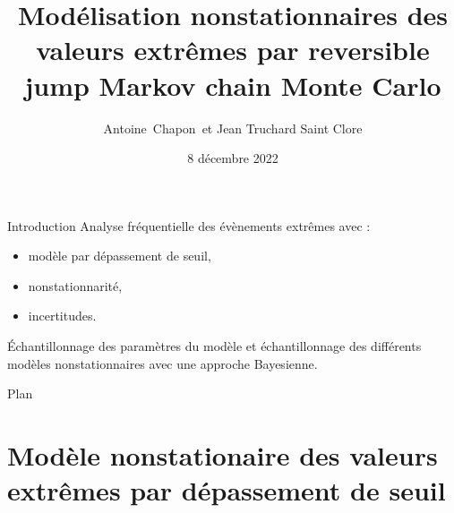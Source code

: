 \documentclass[aspectratio=169]{beamer}
\date{8 décembre 2022}
\title{Modélisation nonstationnaires des valeurs extrêmes par reversible jump Markov chain Monte Carlo}
\author{Antoine~Chapon~et Jean Truchard Saint Clore}
\institute[Universities of Somewhere and Elsewhere] %
{
  cours ETE 405
 }
\begin{document}
\begin{frame}
  \titlepage
\end{frame}



\section*{}

\begin{frame}{Introduction}
Analyse fréquentielle des évènements extrêmes avec :
\vspace{0.5cm}
\begin{itemize}
\setlength{\itemsep}{10pt}
	\item modèle par dépassement de seuil,
	\item nonstationnarité,
	\item incertitudes.
\end{itemize}
\vspace{0.5cm}
Échantillonnage des paramètres du modèle et échantillonnage des différents modèles nonstationnaires avec une approche Bayesienne.
\end{frame}

\begin{frame}{Plan}
\tableofcontents
\end{frame}


\section{Modèle nonstationaire des valeurs extrêmes par dépassement de seuil}
\end{document}
